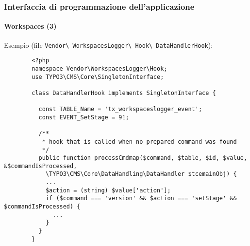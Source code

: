 
\begin{frame}[fragile]
	\frametitle{Interfaccia di programmazione dell'applicazione}
	\framesubtitle{Workspaces (3)}

	Esempio (file \texttt{Vendor\textbackslash
		WorkspacesLogger\textbackslash
		Hook\textbackslash
		DataHandlerHook}):

	\lstset{
		basicstyle=\tiny\ttfamily
	}

	\begin{lstlisting}
		<?php
		namespace Vendor\WorkspacesLogger\Hook;
		use TYPO3\CMS\Core\SingletonInterface;

		class DataHandlerHook implements SingletonInterface {

		  const TABLE_Name = 'tx_workspaceslogger_event';
		  const EVENT_SetStage = 91;

		  /**
		   * hook that is called when no prepared command was found
		   */
		  public function processCmdmap($command, $table, $id, $value, &$commandIsProcessed,
		    \TYPO3\CMS\Core\DataHandling\DataHandler $tcemainObj) {
		    ...
		    $action = (string) $value['action'];
		    if ($command === 'version' && $action === 'setStage' && $commandIsProcessed) {
		      ...
		    }
		  }
		}
	\end{lstlisting}

\end{frame}


